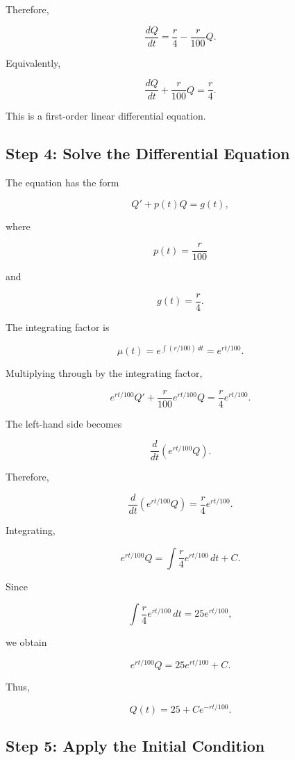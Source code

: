 \documentclass[11pt]{article}
\begin{document}
Therefore,

\[
\boxed{
\frac{dQ}{dt}
=
\frac{r}{4}
-
\frac{r}{100}Q.
}
\]

Equivalently,

\[
\boxed{
\frac{dQ}{dt}
+
\frac{r}{100}Q
=
\frac{r}{4}.
}
\]

This is a first-order linear differential equation.

\subsection{Step 4: Solve the Differential Equation}

The equation has the form

\[
Q'+p(t)Q=g(t),
\]

where

\[
p(t)=\frac{r}{100}
\]

and

\[
g(t)=\frac{r}{4}.
\]

The integrating factor is

\[
\mu(t)
=
e^{\int (r/100)\,dt}
=
e^{rt/100}.
\]

Multiplying through by the integrating factor,

\[
e^{rt/100}Q'
+
\frac{r}{100}e^{rt/100}Q
=
\frac{r}{4}e^{rt/100}.
\]

The left-hand side becomes

\[
\frac{d}{dt}
\left(
e^{rt/100}Q
\right).
\]

Therefore,

\[
\frac{d}{dt}
\left(
e^{rt/100}Q
\right)
=
\frac{r}{4}e^{rt/100}.
\]

Integrating,

\[
e^{rt/100}Q
=
\int
\frac{r}{4}e^{rt/100}\,dt
+
C.
\]

Since

\[
\int
\frac{r}{4}e^{rt/100}\,dt
=
25e^{rt/100},
\]

we obtain

\[
e^{rt/100}Q
=
25e^{rt/100}+C.
\]

Thus,

\[
\boxed{
Q(t)=25+Ce^{-rt/100}.
}
\]

\subsection{Step 5: Apply the Initial Condition}
\end{document}
